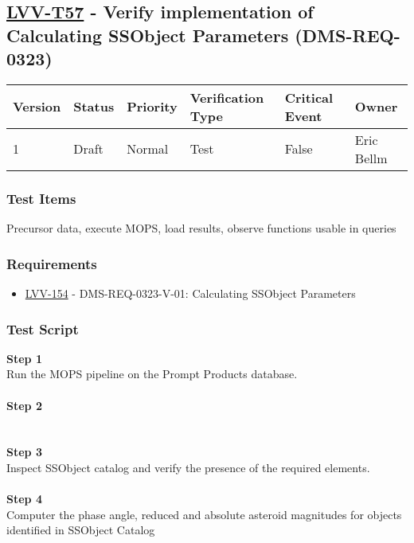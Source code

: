 \hypertarget{lvv-t57---verify-implementation-of-calculating-ssobject-parameters-dms-req-0323}{%
\subsection{\texorpdfstring{\href{https://jira.lsstcorp.org/secure/Tests.jspa\#/testCase/LVV-T57}{LVV-T57}
- Verify implementation of Calculating SSObject Parameters
(DMS-REQ-0323)}{LVV-T57 - Verify implementation of Calculating SSObject Parameters (DMS-REQ-0323)}}\label{lvv-t57---verify-implementation-of-calculating-ssobject-parameters-dms-req-0323}}

\begin{longtable}[]{@{}llllll@{}}
\toprule
Version & Status & Priority & Verification Type & Critical Event &
Owner\tabularnewline
\midrule
\endhead
1 & Draft & Normal & Test & False & Eric Bellm\tabularnewline
\bottomrule
\end{longtable}

\hypertarget{test-items-33}{%
\subsubsection{Test Items}\label{test-items-33}}

Precursor data, execute MOPS, load results, observe functions usable in
queries

\hypertarget{requirements-34}{%
\subsubsection{Requirements}\label{requirements-34}}

\begin{itemize}
\tightlist
\item
  \href{https://jira.lsstcorp.org/browse/LVV-154}{LVV-154} -
  DMS-REQ-0323-V-01: Calculating SSObject Parameters
\end{itemize}

\hypertarget{test-script-34}{%
\subsubsection{Test Script}\label{test-script-34}}

\textbf{Step 1}\\
Run the MOPS pipeline on the Prompt Products database.\\
~\\
\textbf{Step 2}\\
~\\
~\\
\textbf{Step 3}\\
Inspect SSObject catalog and verify the presence of the required
elements.\\
~\\
\textbf{Step 4}\\
Computer the phase angle, reduced and absolute asteroid magnitudes for
objects identified in SSObject Catalog\\
~\\

